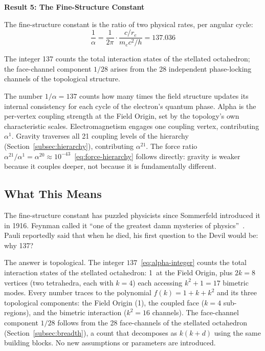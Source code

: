 \documentclass[aps,prd,preprint,superscriptaddress,showpacs,preprintnumbers,amsmath,amssymb,nofootinbib]{revtex4-2}
\begin{document}
\vspace{1.5em}
\noindent
\colorbox{resultgreen}{\parbox{\dimexpr\textwidth-2\fboxsep\relax}{%
\vspace{0.8em}
\centering
\textbf{\large Result 5: The Fine-Structure Constant}

\vspace{0.5em}
The fine-structure constant is the ratio of two physical rates, per angular cycle:
\boldmath
\begin{equation}
\frac{1}{\alpha} = \frac{1}{2\pi} \cdot \frac{c/r_e}{m_e c^2/h} = 137.036
\end{equation}
\unboldmath

\vspace{0.3em}
The integer 137 counts the total interaction states of the stellated octahedron; the face-channel component $1/28$ arises from the 28 independent phase-locking channels of the topological structure.
\vspace{0.5em}
}}
\vspace{1cm}

The number $1/\alpha = 137$ counts how many times the field structure updates its internal consistency for each cycle of the electron's quantum phase. Alpha is the per-vertex coupling strength at the Field Origin, set by the topology's own characteristic scales. Electromagnetism engages one coupling vertex, contributing $\alpha^1$. Gravity traverses all 21 coupling levels of the hierarchy (Section~\ref{subsec:hierarchy}), contributing $\alpha^{21}$. The force ratio $\alpha^{21}/\alpha^1 = \alpha^{20} \approx 10^{-43}$~\eqref{eq:force-hierarchy} follows directly: gravity is weaker because it couples deeper, not because it is fundamentally different.

\subsection{What This Means}
\label{subsec:alpha-meaning}

The fine-structure constant has puzzled physicists since Sommerfeld introduced it in 1916. Feynman called it ``one of the greatest damn mysteries of physics''~\cite{feynman1985}. Pauli reportedly said that when he died, his first question to the Devil would be: why 137?

The answer is topological. The integer $137$~\eqref{eq:alpha-integer} counts the total interaction states of the stellated octahedron: 1~at the Field Origin, plus $2k = 8$ vertices (two tetrahedra, each with $k = 4$) each accessing $k^2 + 1 = 17$ bimetric modes. Every number traces to the polynomial $f(k) = 1 + k + k^2$ and its three topological components: the Field Origin (1), the coupled face ($k = 4$ sub-regions), and the bimetric interaction ($k^2 = 16$ channels). The face-channel component $1/28$ follows from the 28 face-channels of the stellated octahedron (Section~\ref{subsec:breadth}), a count that decomposes as $k(k+d)$ using the same building blocks. No new assumptions or parameters are introduced.
\end{document}
